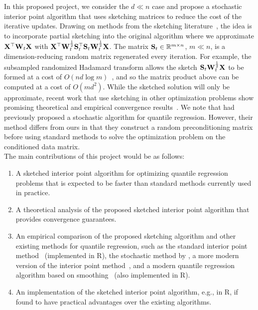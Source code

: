 In this proposed project, we consider the $d\ll n$ case and propose a stochastic interior point algorithm that uses sketching matrices to reduce the cost of the iterative updates. Drawing on methods from the sketching literature~\cite{Pilanci:2017}, the idea is to incorporate partial sketching into the original algorithm where we approximate $\mathbf{X}^\top\mathbf{W}_t\mathbf{X}$ with $\mathbf{X}^\top\mathbf{W}_t^\frac{1}{2}\mathbf{S}_t^\top\mathbf{S}_t\mathbf{W}_t^\frac{1}{2}\mathbf{X}$.
The matrix $\mathbf{S}_t\in\mathbb{R}^{m\times n}$, $m\ll n$, is a dimension-reducing random matrix regenerated every iteration. For example, the subsampled randomized Hadamard transform allows the sketch $\mathbf{S}_t\mathbf{W}_t^\frac{1}{2}\mathbf{X}$ to be formed at a cost of $O(nd\log m)$~\citep{Lacotte:2020}, and so the matrix product above can be computed at a cost of $O(md^2)$. While the sketched solution will only be approximate, recent work that use sketching in other optimization problems show promising theoretical and empirical convergence results~\citep[e.g.,][]{Pilanci:2017,Derezinski:2021,Lacotte:2021}. We note that \citet{Yang:2013} had previously proposed a stochastic algorithm for quantile regression. However, their method differs from ours in that they construct a random preconditioning matrix before using standard methods to solve the optimization problem on the conditioned data matrix.
\\

The main contributions of this project would be as follows:
\begin{enumerate}
\item
A sketched interior point algorithm for optimizing quantile regression problems that is expected to be faster than standard methods currently used in practice.
\item
A theoretical analysis of the proposed sketched interior point algorithm that provides convergence guarantees.
\item
An empirical comparison of the proposed sketching algorithm and other existing methods for quantile regression, such as the standard interior point method~\citep{Portnoy:1997} (implemented in R), the stochastic method by \citet{Yang:2013}, a more modern version of the interior point method~\citep{Zhao:2020}, and a modern quantile regression algorithm based on smoothing~\citep{He:2021} (also implemented in R).
\item
An implementation of the sketched interior point algorithm, e.g., in R, if found to have practical advantages over the existing algorithms.
\end{enumerate}

